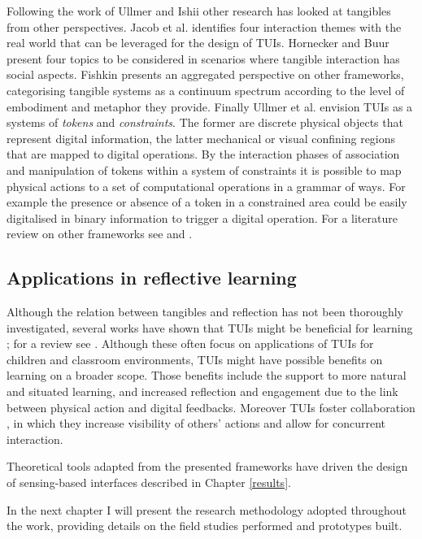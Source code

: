 Following the work of Ullmer and Ishii other research has looked at tangibles from other perspectives. Jacob et al. \autocite*{Jacob:2008vm} identifies four interaction themes with the real world that can be leveraged for the design of TUIs. Hornecker and Buur \autocite*{Hornecker:2006uq} present four topics to be considered in scenarios where tangible interaction has social aspects. Fishkin \autocite{Fishkin:2004uv} presents an aggregated perspective on other frameworks, categorising tangible systems as a continuum spectrum according to the level of embodiment and metaphor they provide. Finally Ullmer et al. \autocite{Ullmer:2005jz} envision TUIs as a systems of \emph{tokens} and \emph{constraints}. The former are discrete physical objects that represent digital information, the latter mechanical or visual confining regions that are mapped to digital operations. By the interaction phases of association and manipulation of tokens within a system of constraints it is possible to map physical actions to a set of computational operations in a grammar of ways. For example the presence or absence of a token in a constrained area could be easily digitalised in binary information to trigger a digital operation. For a literature review on other frameworks see \autocite{Mazalek:2009uy} and \autocite{Shaer:2009fx}.

\subsection{Applications in reflective learning}\label{applications-of-tangibles-in-reflective-learning}

Although the relation between tangibles and reflection has not been thoroughly investigated, several works have shown that TUIs might be beneficial for learning \autocite{Marshall:2007dr}; for a review see \autocite{omalley:hal-00190328}. Although these often focus on applications of TUIs for children and classroom environments, TUIs might have possible benefits on learning on a broader scope. Those benefits include the support to more natural \autocite{Terrenghi:2005gq} and situated \autocite{Klemmer:2006ez} learning, and increased reflection and engagement \autocite{Rogers:2006te} due to the link between physical action and digital feedbacks. Moreover TUIs foster collaboration \autocite{Rogers:2003tt}, in which they increase visibility of others' actions and allow for concurrent interaction.

Theoretical tools adapted from the presented frameworks have driven the design of sensing-based interfaces described in Chapter \ref{results}.

In the next chapter I will present the research methodology adopted throughout the work, providing details on the field studies performed and prototypes built. 

